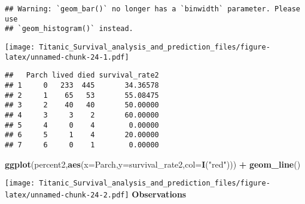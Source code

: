 \documentclass[]{article}
\newenvironment{Shaded}{\begin{snugshade}}{\end{snugshade}}
\newcommand{\KeywordTok}[1]{\textcolor[rgb]{0.13,0.29,0.53}{\textbf{#1}}}
\newcommand{\DataTypeTok}[1]{\textcolor[rgb]{0.13,0.29,0.53}{#1}}
\newcommand{\DecValTok}[1]{\textcolor[rgb]{0.00,0.00,0.81}{#1}}
\newcommand{\StringTok}[1]{\textcolor[rgb]{0.31,0.60,0.02}{#1}}
\newcommand{\OperatorTok}[1]{\textcolor[rgb]{0.81,0.36,0.00}{\textbf{#1}}}
\newcommand{\NormalTok}[1]{#1}
\begin{document}
\begin{verbatim}
## Warning: `geom_bar()` no longer has a `binwidth` parameter. Please use
## `geom_histogram()` instead.
\end{verbatim}

\texttt{[image: Titanic\_Survival\_analysis\_and\_prediction\_files/figure-latex/unnamed-chunk-24-1.pdf]}

\begin{Shaded}
\end{Shaded}

\begin{verbatim}
##   Parch lived died survival_rate2
## 1     0   233  445       34.36578
## 2     1    65   53       55.08475
## 3     2    40   40       50.00000
## 4     3     3    2       60.00000
## 5     4     0    4        0.00000
## 6     5     1    4       20.00000
## 7     6     0    1        0.00000
\end{verbatim}

\begin{Shaded}
\begin{Highlighting}[]
\KeywordTok{ggplot}\NormalTok{(percent2,}\KeywordTok{aes}\NormalTok{(}\DataTypeTok{x=}\NormalTok{Parch,}\DataTypeTok{y=}\NormalTok{survival_rate2,}\DataTypeTok{col=}\KeywordTok{I}\NormalTok{(}\StringTok{"red"}\NormalTok{))) }\OperatorTok{+}\StringTok{ }\KeywordTok{geom_line}\NormalTok{()}
\end{Highlighting}
\end{Shaded}

\texttt{[image: Titanic\_Survival\_analysis\_and\_prediction\_files/figure-latex/unnamed-chunk-24-2.pdf]}
\textbf{Observations}
\end{document}

